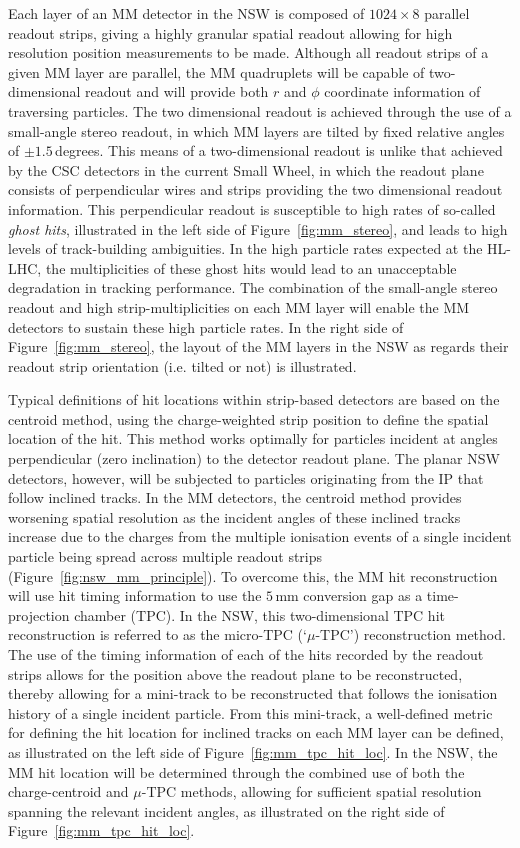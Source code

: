 Each layer of an MM detector in the NSW is composed of $1024 \times 8$ parallel readout strips, giving
a highly granular spatial readout allowing for high resolution position measurements to be made.
Although all readout strips of a given MM layer are parallel, the MM quadruplets will be capable
of two-dimensional readout and will provide both $r$ and $\phi$ coordinate information
of traversing particles.
The two dimensional readout is achieved through the use of a small-angle stereo readout, in which
MM layers are tilted by fixed relative angles of $\pm 1.5$\,degrees.
This means of a two-dimensional readout is unlike that achieved by the CSC detectors in the current
Small Wheel, in which the readout plane consists of perpendicular wires and strips providing
the two dimensional readout information.
This perpendicular readout is susceptible to high rates of so-called \textit{ghost hits},
illustrated in the left side of Figure~\ref{fig:mm_stereo}, and leads to high levels of track-building ambiguities.
In the high particle rates expected at the HL-LHC, the multiplicities of these ghost hits would
lead to an unacceptable degradation in tracking performance.
The combination of the small-angle stereo readout and high strip-multiplicities on each MM layer will
enable the MM detectors to sustain these high particle rates.
In the right side of Figure~\ref{fig:mm_stereo}, the layout of the MM layers in the NSW as regards
their readout strip orientation (i.e. tilted or not) is illustrated.

Typical definitions of hit locations within strip-based detectors are based on the
centroid method, using the charge-weighted strip position to define the spatial location
of the hit.
This method works optimally for particles incident at angles perpendicular (zero inclination) to the detector readout plane.
The planar NSW detectors, however, will be subjected to particles originating from the IP that follow inclined tracks.
In the MM detectors, the centroid method provides worsening spatial resolution as the incident angles of these inclined tracks increase due
to the charges from the multiple ionisation events of a single incident particle being spread across multiple readout strips (Figure~\ref{fig:nsw_mm_principle}).
To overcome this, the MM hit reconstruction will use hit timing information
to use the $5$\,mm conversion gap as a time-projection chamber (TPC).
In the NSW, this two-dimensional TPC hit reconstruction is referred to as the micro-TPC (`$\mu$-TPC') reconstruction method.
The use of the timing information of each of the hits recorded by the readout strips
allows for the position above the readout plane to be reconstructed, thereby
allowing for a mini-track to be reconstructed that follows the ionisation history
of a single incident particle.
From this mini-track, a well-defined metric for defining the hit location for inclined tracks on
each MM layer can be defined, as illustrated on the left side of Figure~\ref{fig:mm_tpc_hit_loc}.
In the NSW, the MM hit location will be determined through the combined use of both the
charge-centroid and $\mu$-TPC methods, allowing for sufficient spatial resolution spanning the relevant
incident angles, as illustrated on the right side of Figure~\ref{fig:mm_tpc_hit_loc}.

